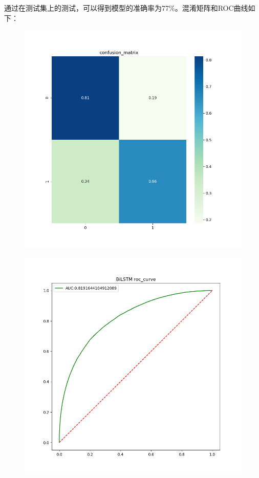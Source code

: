\documentclass{article}
\begin{document}
通过在测试集上的测试，可以得到模型的准确率为77\%。混淆矩阵和ROC曲线如下：
\maketitle
\begin{figure}[H]
    \centering
    \includegraphics[scale=0.4]{pircture/confusion_matrix.png}
\end{figure}

\maketitle
\begin{figure}[H]
    \centering
    \includegraphics[scale=0.4]{pircture/roc_curve.png}
\end{figure}
\end{document}
